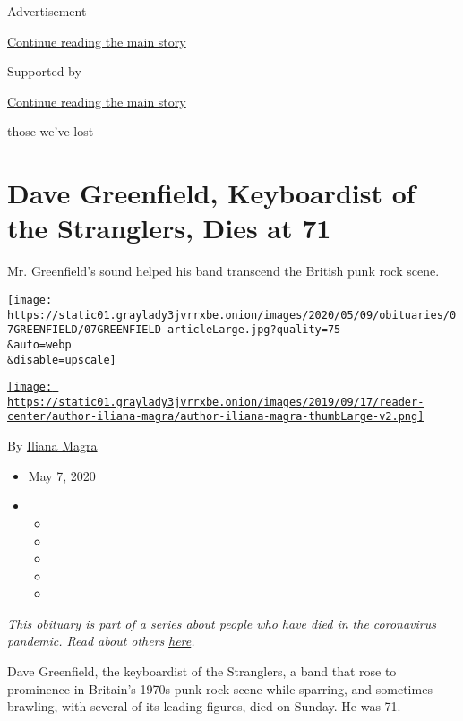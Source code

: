 Advertisement

\protect\hyperlink{after-top}{Continue reading the main story}

Supported by

\protect\hyperlink{after-sponsor}{Continue reading the main story}

those we've lost

\hypertarget{dave-greenfield-keyboardist-of-the-stranglers-dies-at-71}{%
\section{Dave Greenfield, Keyboardist of the Stranglers, Dies at
71}\label{dave-greenfield-keyboardist-of-the-stranglers-dies-at-71}}

Mr. Greenfield's sound helped his band transcend the British punk rock
scene.

\texttt{[image: https://static01.graylady3jvrrxbe.onion/images/2020/05/09/obituaries/07GREENFIELD/07GREENFIELD-articleLarge.jpg?quality=75\\\&auto=webp\\\&disable=upscale]}

\href{https://www.nytimes3xbfgragh.onion/by/iliana-magra}{\texttt{[image: https://static01.graylady3jvrrxbe.onion/images/2019/09/17/reader-center/author-iliana-magra/author-iliana-magra-thumbLarge-v2.png]}}

By \href{https://www.nytimes3xbfgragh.onion/by/iliana-magra}{Iliana
Magra}

\begin{itemize}
\item
  May 7, 2020
\item
  \begin{itemize}
  \item
  \item
  \item
  \item
  \item
  \end{itemize}
\end{itemize}

\emph{This obituary is part of a series about people who have died in
the coronavirus pandemic. Read about others}
\href{https://www.nytimes3xbfgragh.onion/series/people-who-have-died-of-the-coronavirus}{\emph{here}}\emph{.}

Dave Greenfield, the keyboardist of the Stranglers, a band that rose to
prominence in Britain's 1970s punk rock scene while sparring, and
sometimes brawling, with several of its leading figures, died on Sunday.
He was 71.

